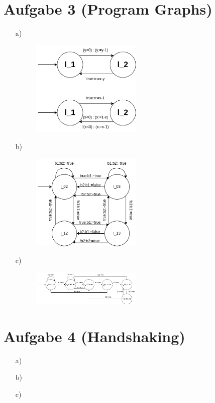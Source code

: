 \documentclass[a4paper,11pt]{scrartcl}
\begin{document}
	\section*{Aufgabe 3 (Program Graphs)}
	\begin{itemize}
		\item[a)] \begin{figure}[h]
			\centering
			\includegraphics[width=0.5\textwidth]{t3a}
			\caption{}
			\label{fig:t3a}
		\end{figure}
		\item[b)] \begin{figure}[h]
			\centering
			\includegraphics[width=0.5\textwidth]{t3b}
			\caption{}
			\label{fig:t3b}
		\end{figure}
		\item[c)] \begin{figure}[h]
			\centering
			\includegraphics[width=0.5\textwidth]{t3c}
			\caption{}
			\label{fig:t3c}
		\end{figure}
	\end{itemize}

		
	
	\section*{Aufgabe 4 (Handshaking)}
	
	\begin{itemize}
		\item[a)]
		\item[b)]
		\item[c)]
	\end{itemize}
	
\end{document}
